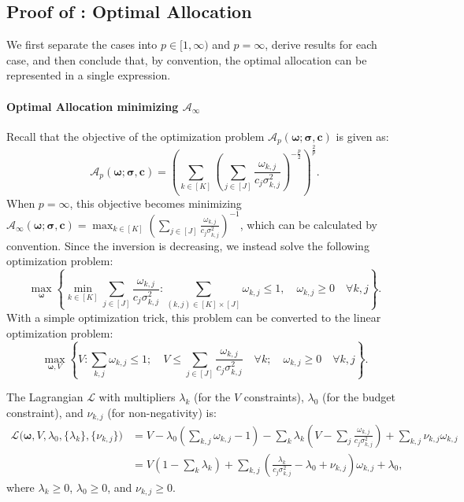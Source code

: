 \documentclass{article}
\def\vc{{\bm{c}}}
\def\gA{{\mathcal{A}}}
\def\gL{{\mathcal{L}}}
\theoremstyle{plain}
\theoremstyle{definition}
\theoremstyle{plain}
\begin{document}
\subsection{\texorpdfstring{Proof of : Optimal Allocation}{Proof of Theorem 3.2: Optimal Allocation}}
\label{app:optimal-allocation}
We first separate the cases into $p\in[1,\infty)$ and $p=\infty$, derive results for each case, and then conclude that, by convention, the optimal allocation can be represented in a single expression.


\paragraph{Optimal Allocation minimizing $\gA_\infty$}
Recall that the objective of the optimization problem $\gA_p(\bm\omega; \bm\sigma, \vc)$ is given as:
\begin{equation}
    \gA_p(\bm\omega; \bm\sigma, \vc) = \left( \sum_{k\in[K]} \left( \sum_{j\in[J]} \frac{\omega_{k,j}}{c_j \sigma_{k,j}^2} \right)^{-\frac{p}{2}} \right)^{\frac{2}{p}}.
\end{equation}
When $p = \infty$, this objective becomes minimizing $\gA_\infty (\bm\omega; \bm\sigma, \vc) = \max_{k\in[K]} \left( \sum_{j\in[J]}  \frac{\omega_{k,j}}{c_j \sigma_{k,j}^2}\right)^{-1}$, which can be calculated by convention. Since the inversion is decreasing, we instead solve the following optimization problem:
\begin{equation}
    \max_{\bm\omega}\left\{ \min_{k \in[K]} \sum_{j\in[J]}\frac{\omega_{k,j}}{c_j\sigma_{k,j}^2}: \sum_{(k,j) \in [K] \times [J]} \omega_{k,j} \leq 1, \quad \omega_{k,j} \geq 0 \quad\forall k,j \right\}.
\end{equation}
With a simple optimization trick, this problem can be converted to the linear optimization problem:
\begin{equation}
    \max_{\bm\omega, V}\left\{ V : \sum_{k,j} \omega_{k,j} \leq 1; \quad V \leq \sum_{j\in[J]} \frac{\omega_{k,j}}{c_j\sigma_{k,j}^2} \quad \forall k;\quad \omega_{k,j} \geq 0 \quad \forall k,j \right\}.
\end{equation}

The Lagrangian $\mathcal{L}$ with multipliers $\lambda_k$ (for the $V$ constraints), $\lambda_0$ (for the budget constraint), and $\nu_{k,j}$ (for non-negativity) is:
\begin{align}
    \gL \big( \bm\omega,V, \lambda_0, \{\lambda_k\}, \{\nu_{k,j}\} \big) & = V - \lambda_0 \left(\sum_{k,j} \omega_{k,j} - 1 \right) - \sum_{k} \lambda_k \left( V - \sum_{j} \frac{\omega_{k,j}}{c_j \sigma_{k,j}^2} \right) + \sum_{k,j} \nu_{k,j} \omega_{k,j}\\
    & = V \left(1 - \sum_{k} \lambda_k \right) + \sum_{k,j} \left( \frac{\lambda_k}{c_j \sigma_{k,j}^2} - \lambda_0 + \nu_{k,j}\right) \omega_{k,j} + \lambda_0,
\end{align}
where $\lambda_k \geq 0$, $\lambda_0 \geq 0$, and $\nu_{k,j} \geq 0$.
\end{document}
